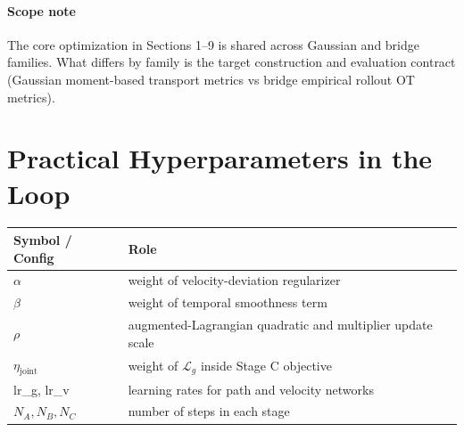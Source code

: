 \documentclass[11pt]{article}
\begin{document}
\paragraph{Scope note}
The core optimization in Sections 1--9 is shared across Gaussian and bridge families.
What differs by family is the target construction and evaluation contract (Gaussian moment-based transport metrics vs bridge empirical rollout OT metrics).

\section{Practical Hyperparameters in the Loop}
\begin{center}
\begin{tabular}{ll}
\toprule
Symbol / Config & Role \\
\midrule
$\alpha$ & weight of velocity-deviation regularizer \\
$\beta$ & weight of temporal smoothness term \\
$\rho$ & augmented-Lagrangian quadratic and multiplier update scale \\
$\eta_{\mathrm{joint}}$ & weight of $\mathcal{L}_g$ inside Stage C objective \\
lr\_g, lr\_v & learning rates for path and velocity networks \\
$N_A,N_B,N_C$ & number of steps in each stage \\
\bottomrule
\end{tabular}
\end{center}
\end{document}
